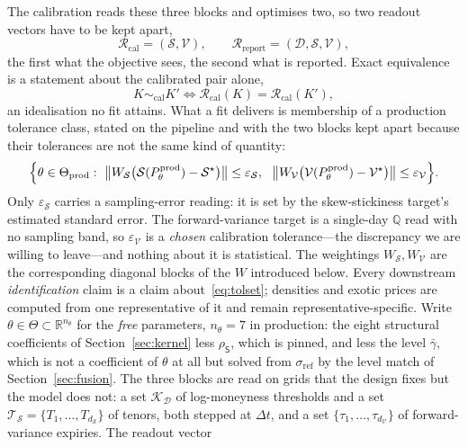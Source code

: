 \documentclass[11pt]{article}
\newcommand{\R}{\mathbb{R}}
\providecommand{\Rcal}{\mathcal R}
\providecommand{\1}{\mathbf 1}
\begin{document}
The calibration reads these three blocks and optimises two, so two readout vectors have to be kept
apart,
\[
  \Rcal_{\mathrm{cal}}=(\mathcal S,\mathcal V),\qquad
  \Rcal_{\mathrm{report}}=(\mathcal D,\mathcal S,\mathcal V),
\]
the first what the objective sees, the second what is reported. Exact equivalence is a statement
about the calibrated pair alone,
\begin{equation}\label{eq:readout-equiv}
  K\sim_{\mathrm{cal}}K'\iff\Rcal_{\mathrm{cal}}(K)=\Rcal_{\mathrm{cal}}(K'),
\end{equation}
an idealisation no fit attains. What a fit delivers is membership of a production tolerance class,
stated on the pipeline and with the two blocks kept apart because their tolerances are not the same
kind of quantity:
\begin{equation}\label{eq:tolset}
  \Bigl\{\theta\in\Theta_{\mathrm{prod}}:\
    \bigl\|W_{\mathcal S}\bigl(\mathcal S(P^{\mathrm{prod}}_\theta)-\mathcal S^{\star}\bigr)\bigr\|
      \le\varepsilon_{\mathcal S},\ \
    \bigl\|W_{\mathcal V}\bigl(\mathcal V(P^{\mathrm{prod}}_\theta)-\mathcal V^{\star}\bigr)\bigr\|
      \le\varepsilon_{\mathcal V}\Bigr\}.
\end{equation}
Only $\varepsilon_{\mathcal S}$ carries a sampling-error reading: it is set by the skew-stickiness
target's estimated standard error. The forward-variance target is a single-day $\mathbb Q$ read with
no sampling band, so $\varepsilon_{\mathcal V}$ is a \emph{chosen} calibration tolerance---the
discrepancy we are willing to leave---and nothing about it is statistical. The weightings
$W_{\mathcal S},W_{\mathcal V}$ are the corresponding diagonal blocks of the $W$ introduced below.
Every downstream \emph{identification} claim is a claim about~\eqref{eq:tolset}; densities and exotic prices are computed from one representative of it and
remain representative-specific. Write $\theta\in\Theta\subset\R^{n_\theta}$ for the \emph{free}
parameters, $n_\theta=7$ in production: the eight structural coefficients of
Section~\ref{sec:kernel} less $\rho_{\mathsf S}$, which is pinned, and less the level $\bar\gamma$,
which is not a coefficient of $\theta$ at all but solved from $\sigma_{\mathrm{ref}}$ by the level
match of Section~\ref{sec:fusion}. The three blocks are read on grids that the design fixes but the model does
not: a set $\mathcal{K}_{\mathcal{D}}$ of log-moneyness thresholds and a set
$\mathcal{T}_{\mathcal{S}}=\{T_1,\dots,T_{d_{\mathcal{S}}}\}$ of tenors, both stepped at $\Delta t$,
and a set $\{\tau_1,\dots,\tau_{d_{\mathcal{V}}}\}$ of forward-variance expiries. The readout vector
\end{document}
